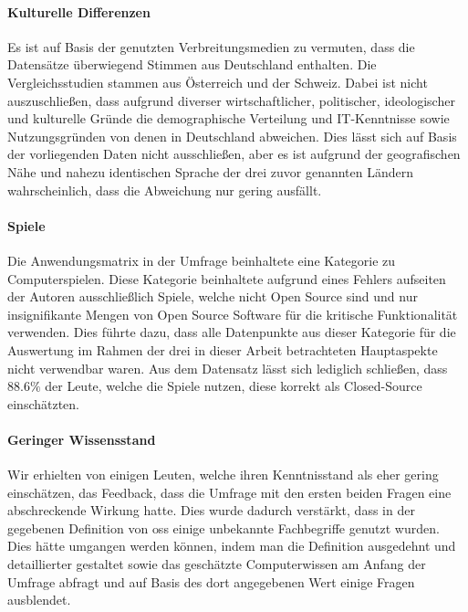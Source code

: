 \documentclass[a4paper]{article}
\begin{document}
            \paragraph{Kulturelle Differenzen}
                Es ist auf Basis der genutzten Verbreitungsmedien zu vermuten, dass die Datensätze überwiegend Stimmen aus Deutschland enthalten. Die Vergleichsstudien stammen aus Österreich\cite{demographicDistributionKnowledge} und der Schweiz\cite{oss:studie}. Dabei ist nicht auszuschließen, dass aufgrund diverser wirtschaftlicher, politischer, ideologischer und kulturelle Gründe die demographische Verteilung und IT-Kenntnisse sowie Nutzungsgründen von denen in Deutschland abweichen. Dies lässt sich auf Basis der vorliegenden Daten nicht ausschließen, aber es ist aufgrund der geografischen Nähe und nahezu identischen Sprache der drei zuvor genannten Ländern wahrscheinlich, dass die Abweichung nur gering ausfällt.
                
            \paragraph{Spiele}
                Die Anwendungsmatrix in der Umfrage beinhaltete eine Kategorie zu Computerspielen. Diese Kategorie beinhaltete aufgrund eines Fehlers aufseiten der Autoren ausschließlich Spiele, welche nicht Open Source sind und nur insignifikante Mengen von Open Source Software für die kritische Funktionalität verwenden. Dies führte dazu, dass alle Datenpunkte aus dieser Kategorie für die Auswertung im Rahmen der drei in dieser Arbeit betrachteten Hauptaspekte nicht verwendbar waren. Aus dem Datensatz lässt sich lediglich schließen, dass $88.6\%$ der Leute, welche die Spiele nutzen, diese korrekt als Closed-Source einschätzten.
                
            \paragraph{Geringer Wissensstand}
                Wir erhielten von einigen Leuten, welche ihren Kenntnisstand als eher gering einschätzen, das Feedback, dass die Umfrage mit den ersten beiden Fragen eine abschreckende Wirkung hatte. Dies wurde dadurch verstärkt, dass in der gegebenen Definition von \gls{oss} einige unbekannte Fachbegriffe genutzt wurden. Dies hätte umgangen werden können, indem man die Definition ausgedehnt und detaillierter gestaltet sowie das geschätzte Computerwissen am Anfang der Umfrage abfragt und auf Basis des dort angegebenen Wert einige Fragen ausblendet.
            
\end{document}
